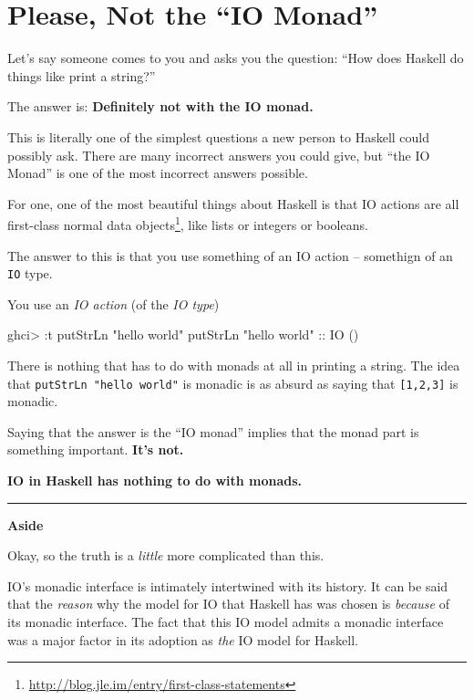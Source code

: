 \documentclass[]{article}
\newenvironment{Shaded}{}{}
\newcommand{\DataTypeTok}[1]{\textcolor[rgb]{0.56,0.13,0.00}{#1}}
\newcommand{\FunctionTok}[1]{\textcolor[rgb]{0.02,0.16,0.49}{#1}}
\newcommand{\NormalTok}[1]{#1}
\newcommand{\OtherTok}[1]{\textcolor[rgb]{0.00,0.44,0.13}{#1}}
\newcommand{\StringTok}[1]{\textcolor[rgb]{0.25,0.44,0.63}{#1}}
\renewcommand{\href}[2]{#2\footnote{\url{#1}}}
\begin{document}
\hypertarget{please-not-the-io-monad}{%
\section{Please, Not the ``IO Monad''}\label{please-not-the-io-monad}}

Let's say someone comes to you and asks you the question: ``How does Haskell do
things like print a string?''

The answer is: \textbf{Definitely not with the IO monad.}

This is literally one of the simplest questions a new person to Haskell could
possibly ask. There are many incorrect answers you could give, but ``the IO
Monad'' is one of the most incorrect answers possible.

For one, one of the most beautiful things about Haskell is that IO actions are
all \href{http://blog.jle.im/entry/first-class-statements}{first-class normal
data objects}, like lists or integers or booleans.

The answer to this is that you use something of an IO action -- somethign of an
\texttt{IO} type.

You use an \emph{IO action} (of the \emph{IO type})

\begin{Shaded}
\begin{Highlighting}[]
\NormalTok{ghci}\FunctionTok{>} \FunctionTok{:}\NormalTok{t putStrLn }\StringTok{"hello world"}
\NormalTok{putStrLn }\StringTok{"hello world"}\OtherTok{ ::} \DataTypeTok{IO}\NormalTok{ ()}
\end{Highlighting}
\end{Shaded}

There is nothing that has to do with monads at all in printing a string. The
idea that \texttt{putStrLn\ "hello\ world"} is monadic is as absurd as saying
that \texttt{{[}1,2,3{]}} is monadic.

Saying that the answer is the ``IO monad'' implies that the monad part is
something important. \textbf{It's not.}

\textbf{IO in Haskell has nothing to do with monads.}

\begin{center}\rule{0.5\linewidth}{\linethickness}\end{center}

\textbf{Aside}

Okay, so the truth is a \emph{little} more complicated than this.

IO's monadic interface is intimately intertwined with its history. It can be
said that the \emph{reason} why the model for IO that Haskell has was chosen is
\emph{because} of its monadic interface. The fact that this IO model admits a
monadic interface was a major factor in its adoption as \emph{the} IO model for
Haskell.
\end{document}
